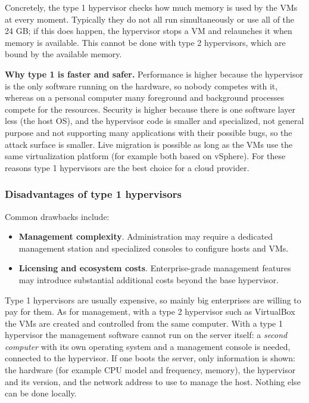 Concretely, the type 1 hypervisor checks how much memory is used by the VMs at every moment. Typically they do not all run simultaneously or use all of the 24 GB; if this does happen, the hypervisor stops a VM and relaunches it when memory is available. This cannot be done with type 2 hypervisors, which are bound by the available memory.

\begin{notebox}
	\textbf{Why type 1 is faster and safer.} Performance is higher because the hypervisor is the only software running on the hardware, so nobody competes with it, whereas on a personal computer many foreground and background processes compete for the resources. Security is higher because there is one software layer less (the host OS), and the hypervisor code is smaller and specialized, not general purpose and not supporting many applications with their possible bugs, so the attack surface is smaller. Live migration is possible as long as the VMs use the same virtualization platform (for example both based on vSphere). For these reasons type 1 hypervisors are the best choice for a cloud provider.
\end{notebox}

\subsubsection*{Disadvantages of type 1 hypervisors}

Common drawbacks include:

\begin{itemize}
\item \textbf{Management complexity}. Administration may require a dedicated management station and specialized consoles to configure hosts and VMs.
\item \textbf{Licensing and ecosystem costs}. Enterprise-grade management features may introduce substantial additional costs beyond the base hypervisor.
\end{itemize}

Type 1 hypervisors are usually expensive, so mainly big enterprises are willing to pay for them. As for management, with a type 2 hypervisor such as VirtualBox the VMs are created and controlled from the same computer. With a type 1 hypervisor the management software cannot run on the server itself: a \emph{second computer} with its own operating system and a management console is needed, connected to the hypervisor. If one boots the server, only information is shown: the hardware (for example CPU model and frequency, memory), the hypervisor and its version, and the network address to use to manage the host. Nothing else can be done locally.

